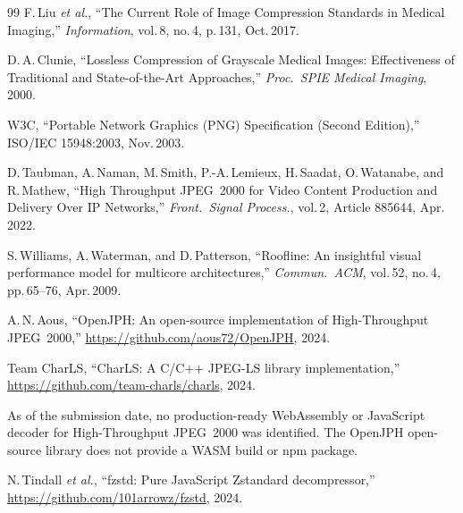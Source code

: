 \documentclass[journal]{IEEEtran}
\begin{document}
\begin{thebibliography}{99}
F.\,Liu \textit{et al.},
``The Current Role of Image Compression Standards in Medical Imaging,''
\textit{Information}, vol.\,8, no.\,4, p.\,131, Oct.\,2017.

D.\,A.\,Clunie,
``Lossless Compression of Grayscale Medical Images: Effectiveness of
Traditional and State-of-the-Art Approaches,''
\textit{Proc.\ SPIE Medical Imaging}, 2000.

W3C, ``Portable Network Graphics (PNG) Specification (Second Edition),''
ISO/IEC 15948:2003, Nov.\,2003.

D.\,Taubman, A.\,Naman, M.\,Smith, P.-A.\,Lemieux, H.\,Saadat, O.\,Watanabe,
and R.\,Mathew,
``High Throughput JPEG~2000 for Video Content Production and Delivery Over IP
Networks,''
\textit{Front.\ Signal Process.}, vol.\,2, Article 885644, Apr.\,2022.

S.\,Williams, A.\,Waterman, and D.\,Patterson,
``Roofline: An insightful visual performance model for multicore
architectures,''
\textit{Commun.\ ACM}, vol.\,52, no.\,4, pp.\,65--76, Apr.\,2009.

A.\,N.\,Aous,
``OpenJPH: An open-source implementation of High-Throughput JPEG~2000,''
\url{https://github.com/aous72/OpenJPH}, 2024.

Team CharLS,
``CharLS: A C/C++ JPEG-LS library implementation,''
\url{https://github.com/team-charls/charls}, 2024.

As of the submission date, no production-ready WebAssembly or JavaScript decoder
for High-Throughput JPEG~2000 was identified. The OpenJPH open-source library
does not provide a WASM build or npm package.

N.\,Tindall \textit{et al.},
``fzstd: Pure JavaScript Zstandard decompressor,''
\url{https://github.com/101arrowz/fzstd}, 2024.

\end{thebibliography}
\end{document}
